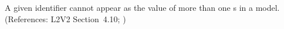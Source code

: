 A given identifier cannot appear as the value of more than one
 \InitialAssignment{}s in a model.  (References:
L2V2 Section~4.10; )
